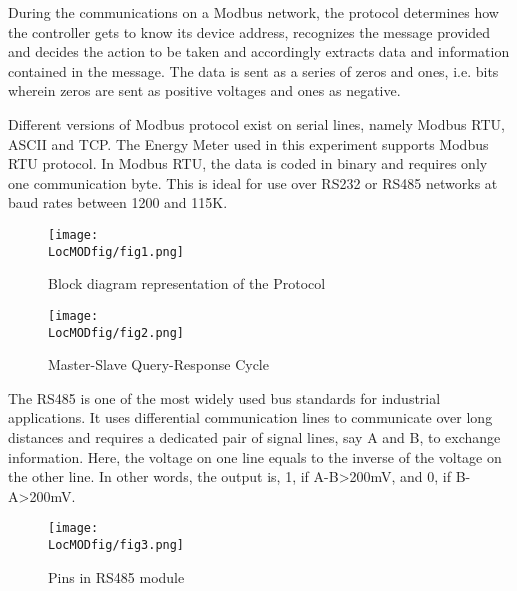 During the communications on a Modbus network, the protocol determines
how the controller gets to know its device address, recognizes the
message provided and decides the action to be taken and accordingly
extracts data and information contained in the message. The data is
sent as a series of zeros and ones, i.e. bits wherein zeros are sent
as positive voltages and ones as negative.

Different versions of Modbus protocol exist on serial lines, namely
Modbus RTU, ASCII and TCP. The Energy Meter used in this experiment
supports Modbus RTU protocol. In Modbus RTU, the data is coded in
binary and requires only one communication byte. This is ideal for use
over RS232 or RS485 networks at baud rates between 1200 and 115K.

\begin{figure}
\centering
\texttt{[image: \\LocMODfig/fig1.png]}
\label{fig:mod-block}
\caption{Block diagram representation of the Protocol}
\end{figure}


\begin{figure}
\centering
\texttt{[image: \\LocMODfig/fig2.png]}
\caption{Master-Slave Query-Response Cycle}
\label{fig:mod-master-slave}
\end{figure}

The RS485 is one of the most widely used bus standards for industrial
applications. It uses differential communication lines to communicate
over long distances and requires a dedicated pair of signal lines, say
A and B, to exchange information. Here, the voltage on one line equals
to the inverse of the voltage on the other line. In other words, the
output is,
1, if A-B\textgreater200mV, and 0, if B-A\textgreater200mV.




\begin{figure}
\centering
\texttt{[image: \\LocMODfig/fig3.png]}
\caption{Pins in RS485 module}
\label{fig:rs-485}
\end{figure}

